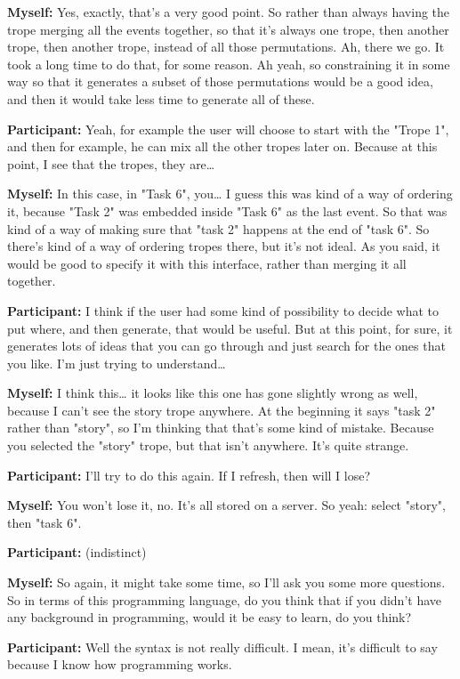 \documentclass[11pt]{report}
\begin{document}
\begin{linenumbers}
\textbf{Myself:} Yes, exactly, that's a very good point. So rather than always having the trope merging all the events together, so that it's always one trope, then another trope, then another trope, instead of all those permutations. Ah, there we go. It took a long time to do that, for some reason. Ah yeah, so constraining it in some way so that it generates a subset of those permutations would be a good idea, and then it would take less time to generate all of these.

\textbf{Participant:} Yeah, for example the user will choose to start with the "Trope 1", and then for example, he can mix all the other tropes later on. Because at this point, I see that the tropes, they are\ldots{}

\textbf{Myself:} In this case, in "Task 6", you\ldots{} I guess this was kind of a way of ordering it, because "Task 2" was embedded inside "Task 6" as the last event. So that was kind of a way of making sure that "task 2" happens at the end of "task 6". So there's kind of a way of ordering tropes there, but it's not ideal. As you said, it would be good to specify it with this interface, rather than merging it all together.

\textbf{Participant:} I think if the user had some kind of possibility to decide what to put where, and then generate, that would be useful. But at this point, for sure, it generates lots of ideas that you can go through and just search for the ones that you like. I'm just trying to understand\ldots{}

\textbf{Myself:} I think this\ldots{} it looks like this one has gone slightly wrong as well, because I can't see the story trope anywhere. At the beginning it says "task 2" rather than "story", so I'm thinking that that's some kind of mistake. Because you selected the "story" trope, but that isn't anywhere. It's quite strange.

\textbf{Participant:} I'll try to do this again. If I refresh, then will I lose?

\textbf{Myself:} You won't lose it, no. It's all stored on a server. So yeah: select "story", then "task 6".

\textbf{Participant:} (indistinct)

\textbf{Myself:} So again, it might take some time, so I'll ask you some more questions. So in terms of this programming language, do you think that if you didn't have any background in programming, would it be easy to learn, do you think?

\textbf{Participant:} Well the syntax is not really difficult. I mean, it's
difficult to say because I know how programming works.


\end{linenumbers}
\end{document}
